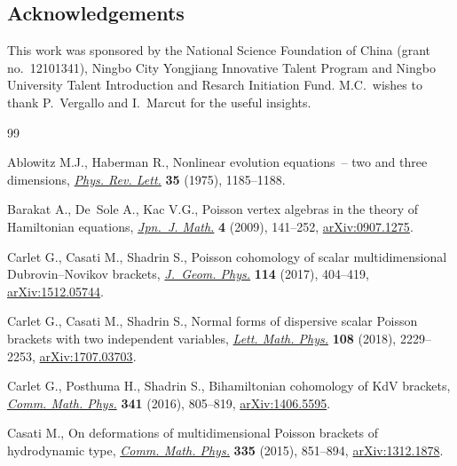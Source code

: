\documentclass[pdftex]{sigma}
\numberwithin{equation}{section}
\begin{document}
\subsection*{Acknowledgements}
This work was sponsored by the National Science Foundation of China (grant no.~12101341), Ningbo City Yongjiang Innovative Talent Program and Ningbo University Talent Introduction and Resarch Initiation Fund. M.C.\ wishes to thank P.~Vergallo and I.~Marcut for the useful insights.

\begin{thebibliography}{99}
\footnotesize\itemsep=0pt

Ablowitz M.J., Haberman R., Nonlinear evolution equations~-- two and three
 dimensions, \href{https://doi.org/10.1103/PhysRevLett.35.1185}{\textit{Phys. Rev. Lett.}} \textbf{35} (1975), 1185--1188.

Barakat A., De~Sole A., Kac V.G., Poisson vertex algebras in the theory of
 {H}amiltonian equations, \href{https://doi.org/10.1007/s11537-009-0932-y}{\textit{Jpn.~J. Math.}} \textbf{4} (2009), 141--252,
 \href{https://arxiv.org/abs/0907.1275}{arXiv:0907.1275}.

Carlet G., Casati M., Shadrin S., Poisson cohomology of scalar multidimensional
 {D}ubrovin--{N}ovikov brackets, \href{https://doi.org/10.1016/j.geomphys.2016.12.008}{\textit{J.~Geom. Phys.}} \textbf{114} (2017),
 404--419, \href{https://arxiv.org/abs/1512.05744}{arXiv:1512.05744}.

Carlet G., Casati M., Shadrin S., Normal forms of dispersive scalar {P}oisson
 brackets with two independent variables, \href{https://doi.org/10.1007/s11005-018-1076-x}{\textit{Lett. Math. Phys.}}
 \textbf{108} (2018), 2229--2253, \href{https://arxiv.org/abs/1707.03703}{arXiv:1707.03703}.

Carlet G., Posthuma H., Shadrin S., Bihamiltonian cohomology of {K}d{V}
 brackets, \href{https://doi.org/10.1007/s00220-015-2540-4}{\textit{Comm. Math. Phys.}} \textbf{341} (2016), 805--819,
 \href{https://arxiv.org/abs/1406.5595}{arXiv:1406.5595}.

Casati M., On deformations of multidimensional {P}oisson brackets of
 hydrodynamic type, \href{https://doi.org/10.1007/s00220-014-2219-2}{\textit{Comm. Math. Phys.}} \textbf{335} (2015), 851--894,
 \href{https://arxiv.org/abs/1312.1878}{arXiv:1312.1878}.


\end{thebibliography}
\end{document}

